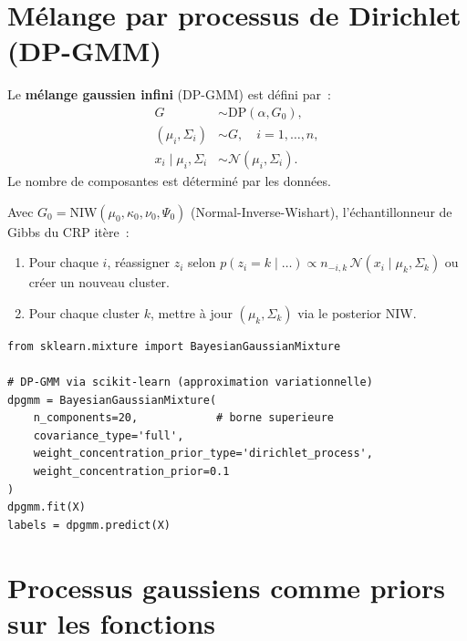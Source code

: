 \section{M\'elange par processus de Dirichlet (DP-GMM)}

\begin{definition}
Le \textbf{m\'elange gaussien infini} (DP-GMM) est d\'efini par~:
\begin{align}
  G &\sim \mathrm{DP}(\alpha, G_0), \\
  (\mu_i, \Sigma_i) &\sim G, \quad i = 1, \ldots, n, \\
  x_i \mid \mu_i, \Sigma_i &\sim \mathcal{N}(\mu_i, \Sigma_i).
\end{align}
Le nombre de composantes est d\'etermin\'e par les donn\'ees.
\end{definition}

\begin{exemple}
Avec $G_0 = \mathrm{NIW}(\mu_0, \kappa_0, \nu_0, \Psi_0)$ (Normal-Inverse-Wishart),
l'\'echantillonneur de Gibbs du CRP it\`ere~:
\begin{enumerate}
  \item Pour chaque $i$, r\'eassigner $z_i$ selon $p(z_i = k \mid \ldots) \propto
        n_{-i,k}\,\mathcal{N}(x_i \mid \mu_k, \Sigma_k)$ ou cr\'eer un nouveau cluster.
  \item Pour chaque cluster $k$, mettre \`a jour $(\mu_k, \Sigma_k)$ via le posterior NIW.
\end{enumerate}
\end{exemple}

\begin{verbatim}
from sklearn.mixture import BayesianGaussianMixture

# DP-GMM via scikit-learn (approximation variationnelle)
dpgmm = BayesianGaussianMixture(
    n_components=20,            # borne superieure
    covariance_type='full',
    weight_concentration_prior_type='dirichlet_process',
    weight_concentration_prior=0.1
)
dpgmm.fit(X)
labels = dpgmm.predict(X)
\end{verbatim}

\section{Processus gaussiens comme priors sur les fonctions}

